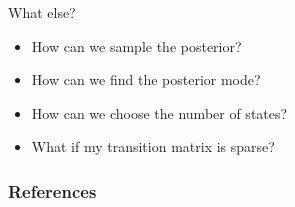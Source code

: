 \documentclass[aspectratio=169]{beamer}
\begin{document}
\begin{frame}{What else?}
    \begin{itemize}
        \item How can we sample the posterior?
        \item How can we find the posterior mode?
        \item How can we choose the number of states?
        \item What if my transition matrix is sparse?
    \end{itemize}
\end{frame}



\begin{frame}[t,allowframebreaks]
        \frametitle{References}
        
        
\end{frame}
\end{document}
